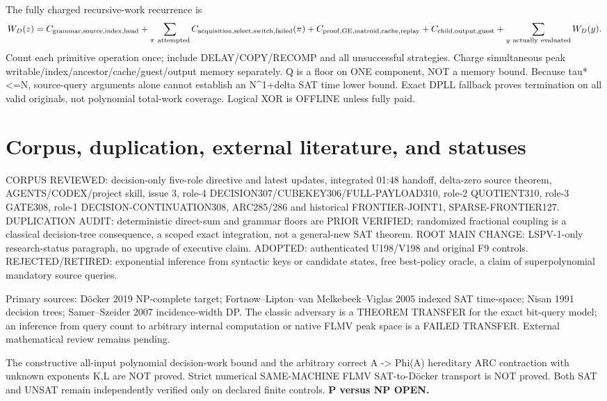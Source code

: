 \documentclass[11pt]{article}
\begin{document}
The fully charged recursive-work recurrence is
\[
W_D(z)=C_{\rm grammar,source,index,head}
+\sum_{\pi\ {\rm attempted}}C_{\rm acquisition,select,switch,failed}(\pi)
+C_{\rm proof,GE,matroid,cache,replay}
+C_{\rm child,output,guest}
+\sum_{y\ {\rm actually\ evaluated}}W_D(y).
\]
Count each primitive operation once; include DELAY/COPY/RECOMP and all unsuccessful strategies. Charge simultaneous peak writable/index/ancestor/cache/guest/output memory separately. Q is a floor on ONE component, NOT a memory bound. Because tau*<=N, source-query arguments alone cannot establish an N^{1+delta} SAT time lower bound. Exact DPLL fallback proves termination on all valid originals, not polynomial total-work coverage. Logical XOR is OFFLINE unless fully paid.

\section{Corpus, duplication, external literature, and statuses}
CORPUS REVIEWED: decision-only five-role directive and latest updates, integrated 01:48 handoff, delta-zero source theorem, AGENTS/CODEX/project skill, issue 3, role-4 DECISION307/CUBEKEY306/FULL-PAYLOAD310, role-2 QUOTIENT310, role-3 GATE308, role-1 DECISION-CONTINUATION308, ARC285/286 and historical FRONTIER-JOINT1, SPARSE-FRONTIER127. DUPLICATION AUDIT: deterministic direct-sum and grammar floors are PRIOR VERIFIED; randomized fractional coupling is a classical decision-tree consequence, a scoped exact integration, not a general-new SAT theorem. ROOT MAIN CHANGE: LSPV-1-only research-status paragraph, no upgrade of executive claim. ADOPTED: authenticated U198/V198 and original F9 controls. REJECTED/RETIRED: exponential inference from syntactic keys or candidate states, free best-policy oracle, a claim of superpolynomial mandatory source queries.

Primary sources: D\"ocker 2019 NP-complete target; Fortnow--Lipton--van Melkebeek--Viglas 2005 indexed SAT time-space; Nisan 1991 decision trees; Samer--Szeider 2007 incidence-width DP. The classic adversary is a THEOREM TRANSFER for the exact bit-query model; an inference from query count to arbitrary internal computation or native FLMV peak space is a FAILED TRANSFER. External mathematical review remains pending.

The constructive all-input polynomial decision-work bound and the arbitrary correct A -> Phi(A) hereditary ARC contraction with unknown exponents K,L are NOT proved. Strict numerical SAME-MACHINE FLMV SAT-to-D\"ocker transport is NOT proved. Both SAT and UNSAT remain independently verified only on declared finite controls. \textbf{P versus NP OPEN.}
\end{document}
